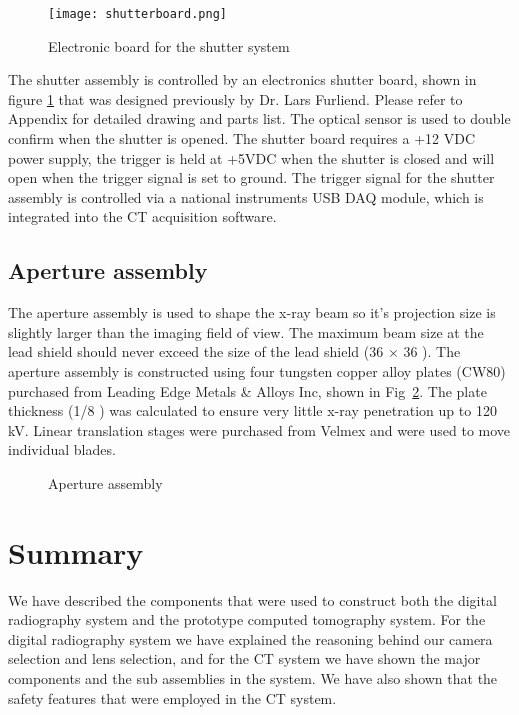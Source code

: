 \begin{figure}
\centering
\texttt{[image: shutterboard.png]}
\caption{Electronic board for the shutter system}
\label{fig:shutterboard}
\end{figure}

The shutter assembly is controlled by an electronics shutter board, shown in figure \ref{fig:shutterboard} that was designed previously by Dr. Lars Furliend.  Please refer to Appendix for detailed drawing and parts list.  The optical sensor is used to double confirm when the shutter is opened.  The shutter board requires a +12 VDC power supply, the trigger is held at +5VDC when the shutter is closed and will open when the trigger signal is set to ground.  The trigger signal for the shutter assembly is controlled via a national instruments USB DAQ module, which is integrated into the CT acquisition software.
		
\subsection{Aperture assembly}
The aperture assembly is used to shape the x-ray beam so it's projection size is slightly larger than the imaging field of view.  The maximum beam size at the lead shield should never exceed the size of the lead shield (36 \inches $\times$ 36 \inches).  The aperture assembly is constructed using four tungsten copper alloy plates (CW80) purchased from Leading Edge Metals \& Alloys Inc, shown in Fig~\ref{fig:aperture}.  The plate thickness (1/8 \inches) was calculated to ensure very little x-ray penetration up to 120 kV.  Linear translation stages were purchased from Velmex and were used to move individual blades.

\begin{figure}
\centering
{}
\caption{Aperture assembly}
\label{fig:aperture}
\end{figure}

\section{Summary}
We have described the components that were used to construct both the digital radiography system and the prototype computed tomography system.  For the digital radiography system we have  explained the reasoning behind our camera selection and lens selection, and for the CT system we have shown the major components and the sub assemblies in the system.  We have also shown that the safety features that were employed in the CT system.
